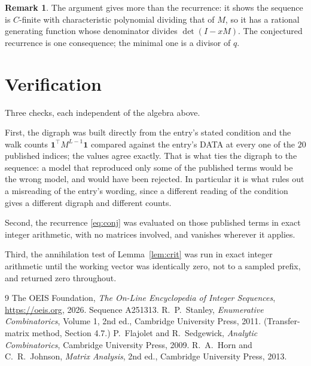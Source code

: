 \documentclass[11pt,a4paper]{article}
\theoremstyle{plain}
\theoremstyle{definition}
\newtheorem{remark}[theorem]{Remark}
\begin{document}
\begin{remark}
The argument gives more than the recurrence: it shows the sequence is $C$-finite with
characteristic polynomial dividing that of $M$, so it has a rational generating function
whose denominator divides $\det(I-xM)$. The conjectured recurrence is one consequence; the
minimal one is a divisor of $q$.
\end{remark}

\section{Verification}

Three checks, each independent of the algebra above.

First, the digraph was built directly from the entry's stated condition and the walk counts
$\mathbf{1}^{\!\top}M^{L-1}\mathbf{1}$ compared against the entry's DATA at
every one of the $20$ published indices; the values agree exactly. That is what ties
the digraph to the sequence: a model that reproduced only some of the published terms would
be the wrong model, and would have been rejected. In particular it is what rules out a
misreading of the entry's wording, since a different reading of the condition gives a
different digraph and different counts.

Second, the recurrence \eqref{eq:conj} was evaluated on those published terms in exact
integer arithmetic, with no matrices involved, and vanishes wherever it applies.

Third, the annihilation test of Lemma~\ref{lem:crit} was run in exact integer arithmetic
until the working vector was identically zero, not to a sampled prefix, and returned zero
throughout.

\begin{thebibliography}{9}
 The OEIS Foundation, \emph{The On-Line Encyclopedia of Integer
Sequences}, \url{https://oeis.org}, 2026. Sequence A251313.
 R.~P.~Stanley, \emph{Enumerative Combinatorics}, Volume 1, 2nd ed.,
Cambridge University Press, 2011. (Transfer-matrix method, Section 4.7.)
 P.~Flajolet and R.~Sedgewick, \emph{Analytic Combinatorics}, Cambridge
University Press, 2009.
 R.~A.~Horn and C.~R.~Johnson, \emph{Matrix Analysis}, 2nd ed., Cambridge
University Press, 2013.
\end{thebibliography}
\end{document}
